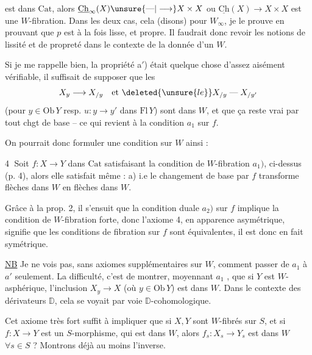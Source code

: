 
est dans $\mathrm{Cat}$, alors $\underline{\mathrm{Ch}}_\infty(X)\unsure{\text{---}|\longrightarrow}X\times X$ ou $\underline{\mathrm{Ch}}(X)\longrightarrow X\times X$ est une $W$-fibration. Dans les deux cas,  cela (disons) pour $W_\infty$, je le prouve en prouvant que $p$ est à la fois lisse, et propre. Il faudrait donc revoir les notions de lissité et de propreté dans le contexte de la donnée d'un $W$.

Si je me rappelle bien, la propriété a$'$) était quelque chose d'assez aisément vérifiable, il suffisait de supposer que les
\[
X_y\longrightarrow X_{/y}\quad\text{et }\deleted{\unsure{le}}X_{/y}\mathrel{\text{---}}X_{/y'}
\]
(pour $y\in\mathrm{Ob}\,Y$ resp. $u:y\longrightarrow y'$ dans $\mathrm{Fl}\,Y$) sont dans $W$, et que ça reste vrai par tout chgt de base -- ce qui revient  à la  condition $a_1$ sur $f$.

On pourrait donc formuler une  condition sur $W$ ainsi :


\textcircled{4}  Soit $f:X\longrightarrow Y$ dans $\mathrm{Cat}$ satisfaisant la condition de $W$-fibration $a_1)$, ci-dessus (p. 4), alors elle satisfait même : a) i.e le changement de base par $f$ transforme flèches dans $W$ en flèches dans $W$. 

Grâce à la prop. 2, il s'ensuit que la condition duale $a_2)$ sur $f$ implique la condition de $W$-fibration forte, donc l'axiome 4, en apparence asymétrique,  signifie  que les  conditions de fibration sur $f$ sont équivalentes, il est donc en fait symétrique. 

\uline{NB} Je ne vois pas, sans axiomes supplémentaires sur $W$, comment passer de $a_1$ à $a'$ seulement. La difficulté, c'est de montrer, moyennant $a_1$ , que  si $Y$ est $W$-asphérique, l'inclusion $X_y\longrightarrow X$ (où $y\in\mathrm{Ob}\,Y$) est dans $W$. Dans le contexte des dérivateurs $\mathbb{D}$, cela se voyait par voie $\mathbb{D}$-cohomologique.

Cet axiome très fort suffit à impliquer que si $X,Y$ sont $W$-fibrés sur $S$, et si $f:X\longrightarrow Y$ est un $S$-morphisme, qui est dans $W$, alors $f_s:X_s\longrightarrow Y_s$ est dans $W$ $\forall s\in S$ ? Montrons déjà au moins l'inverse.

